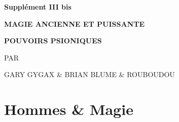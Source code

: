 \newpage
{}\begin{center}
{\Huge {}}{\normalsize \textsuperscript{\sffamily\textregistered}}

\vspace{1.8cm}

{\Large \textbf{Supplément III bis}}

\vspace{1.3cm}

{\Huge {}}

\vspace{0.3cm}

{\Huge {}}

\vspace{2.0cm}

{\Large \textbf{MAGIE ANCIENNE ET PUISSANTE}}

\vspace{0.5cm}

{\Large \textbf{POUVOIRS PSIONIQUES}}

\vspace{1cm}

{\large PAR

\vspace{0.1cm}

GARY GYGAX \& BRIAN BLUME \& ROUBOUDOU}
\end{center}

\newpage
\phantom{-}
\newpage
\section*{Hommes \& Magie}

